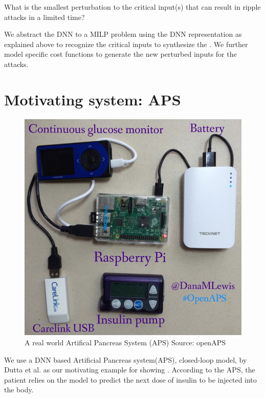 
\begin{problem}
	What is the smallest perturbation to the critical input(s) that can result in ripple attacks in a limited time?
\end{problem}

\begin{approach*}
	We abstract the DNN to a MILP problem using the DNN representation as explained above to recognize the critical inputs to synthesize the \attack. We further model \attack specific cost functions to generate the new perturbed inputs for the attacks. 
\end{approach*}

\section{Motivating system: APS}

\begin{figure}
	\centering
	\includegraphics[width=0.7\linewidth]{Images/APSrig}
	\caption{A real world Artifical Pancreas System (APS) Source: openAPS}
	\label{fig:apsrig}
\end{figure}
We use a DNN based Artificial Pancreas system(APS), closed-loop model, by Dutta et al. \cite{10.1007/978-3-319-99429-1_11}  as our motivating example for showing \attack. According to the APS, the patient relies on the model to predict the next dose of insulin to be injected into the body. 


